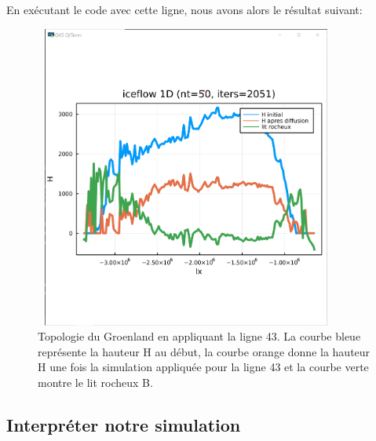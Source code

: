 \documentclass{article}
\begin{document}
En exécutant le code avec cette ligne, nous avons alors le résultat suivant: 
\begin{figure}[!htpb]
\centering
\includegraphics[width=10cm, keepaspectratio=true, height=10cm]{ligne43.png}
\caption{Topologie du Groenland en appliquant la ligne 43. La courbe bleue  représente la hauteur H au début, la courbe orange donne la hauteur H une fois la simulation appliquée pour la ligne 43 et la courbe verte montre le lit rocheux B. }
\label{ligne43}
\end{figure}

\subsection{Interpréter notre simulation}
\end{document}
